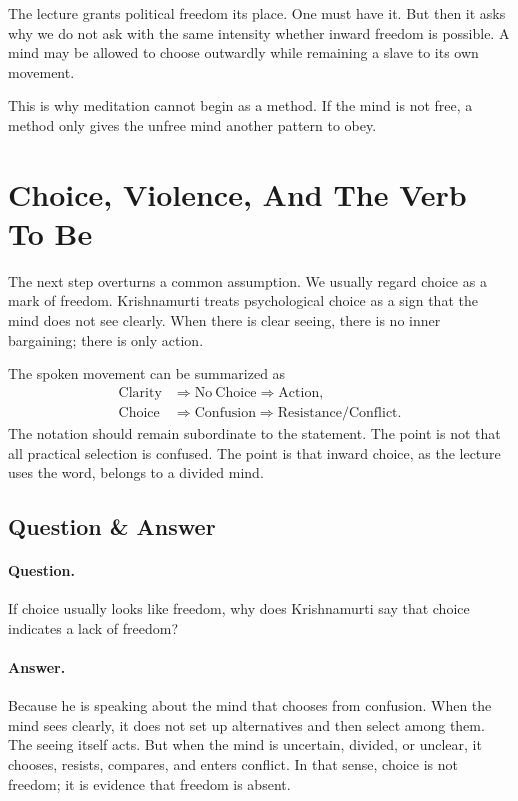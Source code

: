 The lecture grants political freedom its place. One must have it. But then it asks why we do not ask with the same intensity whether inward freedom is possible. A mind may be allowed to choose outwardly while remaining a slave to its own movement.

This is why meditation cannot begin as a method. If the mind is not free, a method only gives the unfree mind another pattern to obey.

\section{Choice, Violence, And The Verb To Be}

The next step overturns a common assumption. We usually regard choice as a mark of freedom. Krishnamurti treats psychological choice as a sign that the mind does not see clearly. When there is clear seeing, there is no inner bargaining; there is only action.

The spoken movement can be summarized as
\begin{align}
\mathrm{Clarity}
&\Rightarrow \mathrm{No\ Choice}
\Rightarrow \mathrm{Action}, \\
\mathrm{Choice}
&\Rightarrow \mathrm{Confusion}
\Rightarrow \mathrm{Resistance/Conflict}.
\end{align}
The notation should remain subordinate to the statement. The point is not that all practical selection is confused. The point is that inward choice, as the lecture uses the word, belongs to a divided mind.

\subsection{Question \& Answer}

\paragraph{Question.}
If choice usually looks like freedom, why does Krishnamurti say that choice indicates a lack of freedom?

\paragraph{Answer.}
Because he is speaking about the mind that chooses from confusion. When the mind sees clearly, it does not set up alternatives and then select among them. The seeing itself acts. But when the mind is uncertain, divided, or unclear, it chooses, resists, compares, and enters conflict. In that sense, choice is not freedom; it is evidence that freedom is absent.

